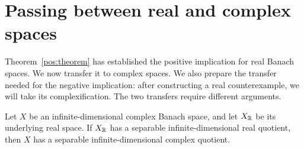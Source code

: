 \section{Passing between real and complex spaces}\label{sec:fields}


Theorem~\ref{pos:theorem} has established the positive implication for
real Banach spaces. We now transfer it to complex spaces. We also prepare
the transfer needed for the negative implication: after constructing a
real counterexample, we will take its complexification. The two transfers
require different arguments.

\begin{proposition}\label{ev:positive-transfer}
Let $X$ be an infinite-dimensional complex Banach space, and let $X_{\mathbb R}$
be its underlying real space.  If $X_{\mathbb R}$ has a separable
infinite-dimensional real quotient, then $X$ has a separable
infinite-dimensional complex quotient.
\end{proposition}

